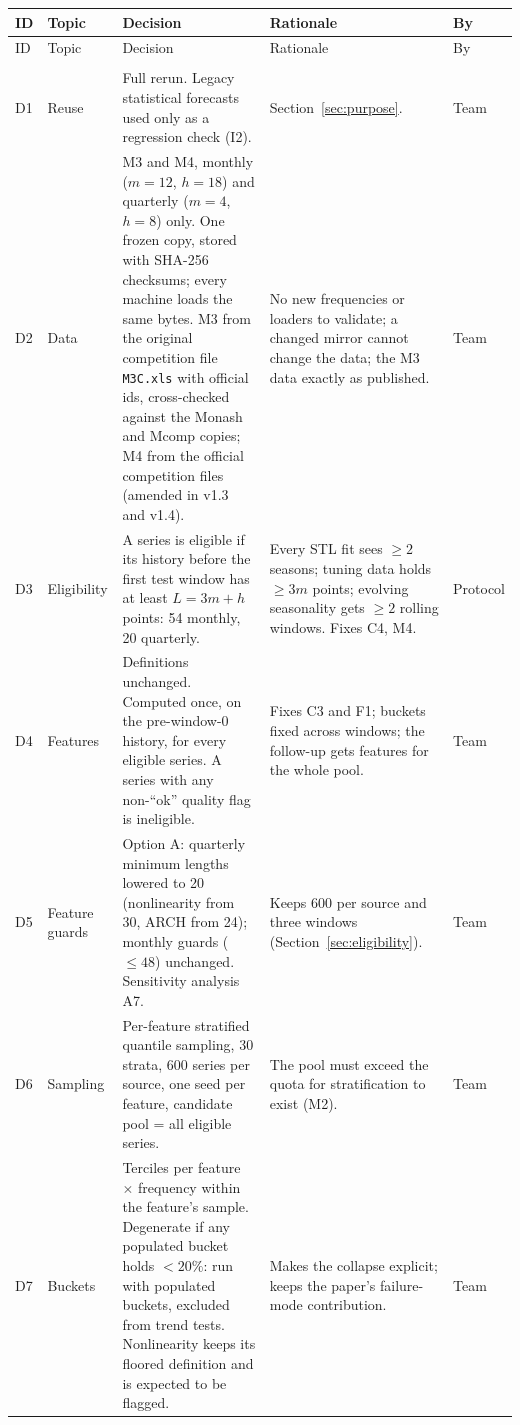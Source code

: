 \documentclass[11pt,a4paper]{article}
\newcommand{\code}[1]{\texttt{#1}}
\begin{document}
{\small
\begin{longtable}{@{}p{0.6cm} p{2.1cm} p{6.3cm} p{4.3cm} p{1.5cm}@{}}
\toprule
ID & Topic & Decision & Rationale & By \\
\midrule
\endfirsthead
\toprule
ID & Topic & Decision & Rationale & By \\
\midrule
\endhead
\bottomrule
\endfoot
\multicolumn{5}{@{}l}{\emph{Scope and data}}\\
D1 & Reuse & Full rerun. Legacy statistical forecasts used only as a regression check (I2). & Section~\ref{sec:purpose}. & Team \\
D2 & Data & M3 and M4, monthly ($m=12$, $h=18$) and quarterly ($m=4$, $h=8$) only. One frozen copy, stored with SHA-256 checksums; every machine loads the same bytes. M3 from the original competition file \code{M3C.xls} with official ids, cross-checked against the Monash and Mcomp copies; M4 from the official competition files (amended in v1.3 and v1.4). & No new frequencies or loaders to validate; a changed mirror cannot change the data; the M3 data exactly as published. & Team \\
D3 & Eligibility & A series is eligible if its history before the first test window has at least $L = 3m+h$ points: 54 monthly, 20 quarterly. & Every STL fit sees $\geq 2$ seasons; tuning data holds $\geq 3m$ points; evolving seasonality gets $\geq 2$ rolling windows. Fixes C4, M4. & Protocol \\
D4 & Features & Definitions unchanged. Computed once, on the pre-window-0 history, for every eligible series. A series with any non-``ok'' quality flag is ineligible. & Fixes C3 and F1; buckets fixed across windows; the follow-up gets features for the whole pool. & Team \\
D5 & Feature guards & Option A: quarterly minimum lengths lowered to 20 (nonlinearity from 30, ARCH from 24); monthly guards ($\leq 48$) unchanged. Sensitivity analysis A7. & Keeps 600 per source and three windows (Section~\ref{sec:eligibility}). & Team \\
D6 & Sampling & Per-feature stratified quantile sampling, 30 strata, 600 series per source, one seed per feature, candidate pool = all eligible series. & The pool must exceed the quota for stratification to exist (M2). & Team \\
D7 & Buckets & Terciles per feature $\times$ frequency within the feature's sample. Degenerate if any populated bucket holds $< 20\%$: run with populated buckets, excluded from trend tests. Nonlinearity keeps its floored definition and is expected to be flagged. & Makes the collapse explicit; keeps the paper's failure-mode contribution. & Team \\

\end{longtable}}
\end{document}
